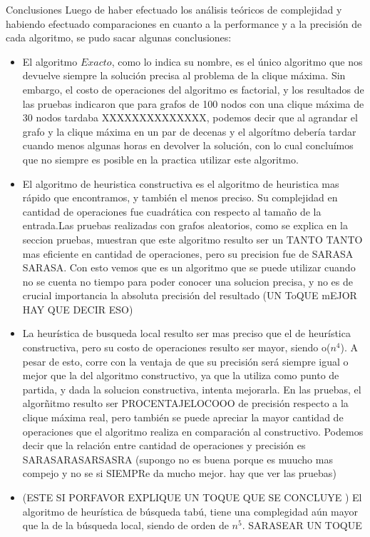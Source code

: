 \documentclass[12pt,titlepage]{article}
\newcommand{\tab}{\hspace*{2em}}
\begin{document}
	\begin{section}{Conclusiones}
	\tab Luego de haber efectuado los análisis teóricos de complejidad y habiendo efectuado comparaciones en cuanto a la performance y a la precisión de cada algoritmo, se pudo sacar algunas conclusiones:
	\begin{itemize}
		\item El algoritmo $Exacto$, como lo indica su nombre, es el único algoritmo que nos devuelve siempre la solución precisa al problema de la clique máxima. Sin embargo, el costo de operaciones del algoritmo es factorial, y los resultados de las pruebas indicaron que para grafos de 100 nodos con una clique máxima de 30 nodos tardaba XXXXXXXXXXXXXX, podemos decir que al agrandar el grafo y la clique máxima en un par de decenas y el algorítmo debería tardar cuando menos algunas horas en devolver la solución, con lo cual concluímos que no siempre es posible en la practica utilizar este algoritmo.
		\item El algoritmo de heuristica constructiva es el algoritmo de heuristica mas rápido que encontramos, y también el menos preciso. Su complejidad en cantidad de operaciones fue cuadrática con respecto al tamaño de la entrada.Las pruebas realizadas con grafos aleatorios, como se explica en la seccion pruebas, muestran que este algoritmo resulto ser un TANTO TANTO mas eficiente en cantidad de operaciones, pero su precision fue de SARASA SARASA. Con esto vemos que es un algoritmo que se puede utilizar cuando no se cuenta no tiempo para poder conocer una solucion precisa, y no es de crucial importancia la absoluta precisión del resultado (UN ToQUE mEJOR HAY QUE DECIR ESO)
		\item La heurística de busqueda local resulto ser mas preciso que el de heurística constructiva, pero su costo de operaciones resulto ser mayor, siendo o($n^4$). A pesar de esto, corre con la ventaja de que su precisión será siempre igual o mejor que la del algoritmo constructivo, ya que la utiliza como punto de partida, y dada la solucion constructiva, intenta mejorarla. En las pruebas, el algorñitmo resulto ser PROCENTAJELOCOOO de precisión respecto a la clique máxima real, pero también se puede apreciar la mayor cantidad de operaciones que el algoritmo realiza en comparación al constructivo. Podemos decir que la relación entre cantidad de operaciones y precisión es SARASARASARSASRA (supongo no es buena porque es muucho mas compejo y no se si SIEMPRe da mucho mejor. hay que ver las pruebas)
		\item (ESTE SI PORFAVOR EXPLIQUE UN TOQUE QUE SE CONCLUYE ) El algoritmo de heurística de búsqueda tabú, tiene una complegidad aún mayor que la de la búsqueda local, siendo de orden de $n^5$. SARASEAR UN TOQUE
	\end{itemize}


\end{section}
\end{document}
